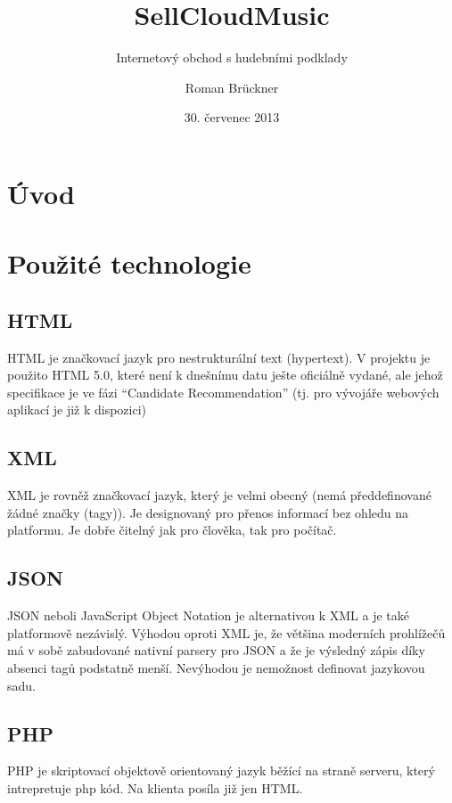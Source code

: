 \documentclass[12pt]{article}
\title{SellCloudMusic}
\subtitle{Internetový obchod s hudebními podklady}
\author{Roman Brückner}
\date{30. červenec 2013}
\begin{document}
\maketitle
\newpage


\section{Úvod}
\section{Použité technologie}

\subsection{HTML}
HTML je značkovací jazyk pro nestrukturální text (hypertext). V projektu je použito HTML 5.0, které není k dnešnímu datu ješte oficiálně vydané, ale jehož specifikace je ve fázi ``Candidate Recommendation'' (tj. pro vývojáře webových aplikací je již k dispozici)\cite{w3c}

\subsection{XML}
XML je rovněž značkovací jazyk, který je velmi obecný (nemá předdefinované žádné značky (tagy)). Je designovaný pro přenos informací bez ohledu na platformu. Je dobře čitelný jak pro člověka, tak pro počítač.

\subsection{JSON}
JSON neboli JavaScript Object Notation je alternativou k XML a je také platformově nezávislý. Výhodou oproti XML je, že většina moderních prohlížečů má v sobě zabudované nativní parsery pro JSON a že je výsledný zápis díky absenci tagů podstatně menší. Nevýhodou je nemožnost definovat jazykovou sadu.

\subsection{PHP}
PHP je skriptovací objektově orientovaný jazyk běžící na straně serveru, který intrepretuje php kód. Na klienta posíla již jen HTML.
\end{document}
